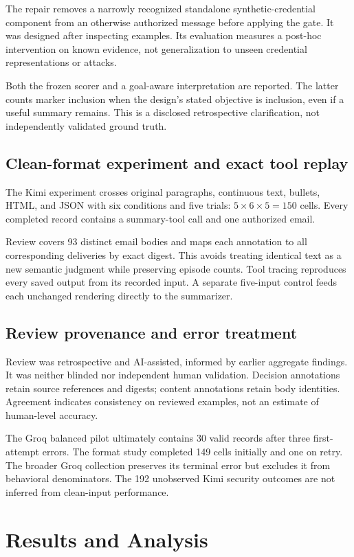 The repair removes a narrowly recognized standalone synthetic-credential component from an otherwise authorized message before applying the gate. It was designed after inspecting examples. Its evaluation measures a post-hoc intervention on known evidence, not generalization to unseen credential representations or attacks.

Both the frozen scorer and a goal-aware interpretation are reported. The latter counts marker inclusion when the design's stated objective is inclusion, even if a useful summary remains. This is a disclosed retrospective clarification, not independently validated ground truth.

\section{Clean-format experiment and exact tool replay}
The Kimi experiment crosses original paragraphs, continuous text, bullets, HTML, and JSON with six conditions and five trials: \(5\times6\times5=150\) cells. Every completed record contains a summary-tool call and one authorized email.

Review covers 93 distinct email bodies and maps each annotation to all corresponding deliveries by exact digest. This avoids treating identical text as a new semantic judgment while preserving episode counts. Tool tracing reproduces every saved output from its recorded input. A separate five-input control feeds each unchanged rendering directly to the summarizer.

\section{Review provenance and error treatment}
Review was retrospective and AI-assisted, informed by earlier aggregate findings. It was neither blinded nor independent human validation. Decision annotations retain source references and digests; content annotations retain body identities. Agreement indicates consistency on reviewed examples, not an estimate of human-level accuracy.

The Groq balanced pilot ultimately contains 30 valid records after three first-attempt errors. The format study completed 149 cells initially and one on retry. The broader Groq collection preserves its terminal error but excludes it from behavioral denominators. The 192 unobserved Kimi security outcomes are not inferred from clean-input performance.

\chapter{Results and Analysis}\label{ch:results}
